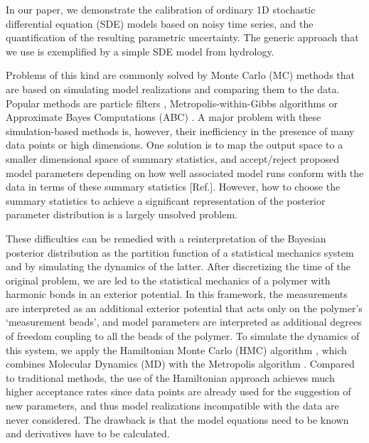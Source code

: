 \documentclass[11pt]{article}
\theoremstyle{definition}
\begin{document}
In our paper, we demonstrate the calibration of ordinary 1D stochastic differential equation (SDE) models based on noisy time series, and the quantification of the resulting parametric uncertainty. The generic approach that we use is exemplified by a simple SDE model from hydrology.

Problems of this kind are commonly solved by Monte Carlo (MC) methods that are based on simulating model realizations and comparing them to the data. Popular methods are particle filters \cite{chopin_2013_SMC2}, Metropolis-within-Gibbs algorithms \cite{tomassini_2009_smoothing, reichert_2009_timedepParameters} or Approximate Bayes Computations (ABC) \cite{marin_2012_ABC, Albert_2014_ABC}.
A major problem with these simulation-based methods is, however, their inefficiency in the presence of many data points or high dimensions. One solution is to map the output space to a smaller dimensional space of summary statistics, and accept/reject proposed model parameters depending on how well associated model runs conform with the data in terms of these summary statistics [Ref.]. However, how to choose the summary statistics to achieve a significant representation of the posterior parameter distribution is a largely unsolved problem.

These difficulties can be remedied with a reinterpretation of the Bayesian posterior distribution as the partition function of a statistical mechanics system and by simulating the dynamics of the latter.
After discretizing the time of the original problem, we are led to the statistical mechanics of a polymer %
with harmonic bonds in an exterior potential. In this framework, the measurements are interpreted as an additional exterior potential that acts only on the polymer's `measurement beads', and model parameters are interpreted as additional degrees of freedom coupling to all the beads of the polymer.
To simulate the dynamics of this system, we apply the Hamiltonian Monte Carlo (HMC) algorithm \cite{duane_1987}, which combines Molecular Dynamics (MD) \cite{alder_1959_MD, rahman_1964_MD} with the Metropolis algorithm  \cite{metropolis_1953}.
Compared to traditional methods, the use of the Hamiltonian approach achieves much higher acceptance rates since data points are already used for the suggestion of new parameters, and thus model realizations incompatible with the data are never considered. The drawback is that the model equations need to be known and derivatives have to be calculated.
\end{document}
